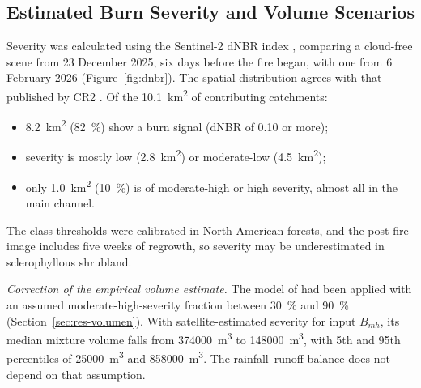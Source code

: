 \subsection{Estimated Burn Severity and Volume Scenarios}\label{sec:res-incendio}
Severity was calculated using the Sentinel-2 dNBR index \citep{keybenson2006}, comparing a cloud-free scene from 23 December 2025, six days before the fire began, with one from 6 February 2026 (Figure~\ref{fig:dnbr}). The spatial distribution agrees with that published by CR2 \citep{cr2_2026}. Of the \SI{10.1}{km^2} of contributing catchments:
\begin{itemize}
\item \SI{8.2}{km^2} (\SI{82}{\percent}) show a burn signal (dNBR of 0.10 or more);
\item severity is mostly low (\SI{2.8}{km^2}) or moderate-low (\SI{4.5}{km^2});
\item only \SI{1.0}{km^2} (\SI{10}{\percent}) is of moderate-high or high severity, almost all in the main channel.
\end{itemize}
The class thresholds were calibrated in North American forests, and the post-fire image includes five weeks of regrowth, so severity may be underestimated in sclerophyllous shrubland.

\emph{Correction of the empirical volume estimate.} The model of \citet{gartner2014} had been applied with an assumed moderate-high-severity fraction between \SI{30}{\percent} and \SI{90}{\percent} (Section~\ref{sec:res-volumen}). With satellite-estimated severity for input $B_{mh}$, its median mixture volume falls from \SI{374000}{m^3} to \SI{148000}{m^3}, with 5th and 95th percentiles of \SI{25000}{m^3} and \SI{858000}{m^3}. The rainfall--runoff balance does not depend on that assumption.

